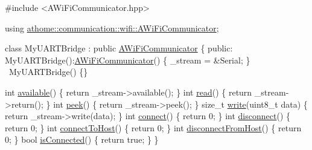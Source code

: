 \begin{DoxyCode}
\textcolor{preprocessor}{#include <AWiFiCommunicator.hpp>}

\textcolor{keyword}{using} \mbox{\hyperlink{classathome_1_1communication_1_1wifi_1_1_a_wi_fi_communicator}{athome::communication::wifi::AWiFiCommunicator}};

\textcolor{keyword}{class }MyUARTBridge : \textcolor{keyword}{public} \mbox{\hyperlink{classathome_1_1communication_1_1wifi_1_1_a_wi_fi_communicator_a0098148fe8d0eeee99b7f8f72a72a900}{AWiFiCommunicator}} \{
  \textcolor{keyword}{public}:
    MyUARTBridge():\mbox{\hyperlink{classathome_1_1communication_1_1wifi_1_1_a_wi_fi_communicator_a0098148fe8d0eeee99b7f8f72a72a900}{AWiFiCommunicator}}() \{
      \_stream = &Serial;
    \}
    ~MyUARTBridge() \{\}

    \textcolor{keywordtype}{int} \mbox{\hyperlink{classathome_1_1communication_1_1_a_network_communicator_a2bf367d03c98e8523fda71dd43ffa2fb}{available}}() \{ \textcolor{keywordflow}{return} \_stream->available(); \}
    \textcolor{keywordtype}{int} \mbox{\hyperlink{classathome_1_1communication_1_1_a_network_communicator_a88d3c4366daf48865ab48b22eb62d610}{read}}() \{ \textcolor{keywordflow}{return} \_stream->return(); \}
    \textcolor{keywordtype}{int} \mbox{\hyperlink{classathome_1_1communication_1_1_a_network_communicator_ad06ecdc94aa77b1bab934b85bed2ac7d}{peek}}() \{ \textcolor{keywordflow}{return} \_stream->peek(); \}
    \textcolor{keywordtype}{size\_t} \mbox{\hyperlink{classathome_1_1communication_1_1_a_network_communicator_a87adf68359a4ec5b0a38bea529ebf732}{write}}(uint8\_t data) \{ \textcolor{keywordflow}{return} \_stream->write(data); \}
    \textcolor{keywordtype}{int} \mbox{\hyperlink{classathome_1_1communication_1_1wifi_1_1_a_wi_fi_communicator_a309927109fbc19aa0fb2afb71d50bbf9}{connect}}() \{ \textcolor{keywordflow}{return} 0; \}
    \textcolor{keywordtype}{int} \mbox{\hyperlink{classathome_1_1communication_1_1wifi_1_1_a_wi_fi_communicator_a6131240ac0daa0f9fb4d46871feea4c2}{disconnect}}() \{ \textcolor{keywordflow}{return} 0; \}
    \textcolor{keywordtype}{int} \mbox{\hyperlink{classathome_1_1communication_1_1_a_network_communicator_a370176dae8f38225446e83a132dbcff7}{connectToHost}}() \{ \textcolor{keywordflow}{return} 0; \}
    \textcolor{keywordtype}{int} \mbox{\hyperlink{classathome_1_1communication_1_1_a_network_communicator_a025b7fbe9b3c4452fcf1925d766324eb}{disconnectFromHost}}() \{ \textcolor{keywordflow}{return} 0; \}
    \textcolor{keywordtype}{bool} \mbox{\hyperlink{classathome_1_1communication_1_1wifi_1_1_a_wi_fi_communicator_a578087d01c814481d89ea702a6d7ed01}{isConnected}}() \{ \textcolor{keywordflow}{return} \textcolor{keyword}{true}; \}
\}
\end{DoxyCode}
 

